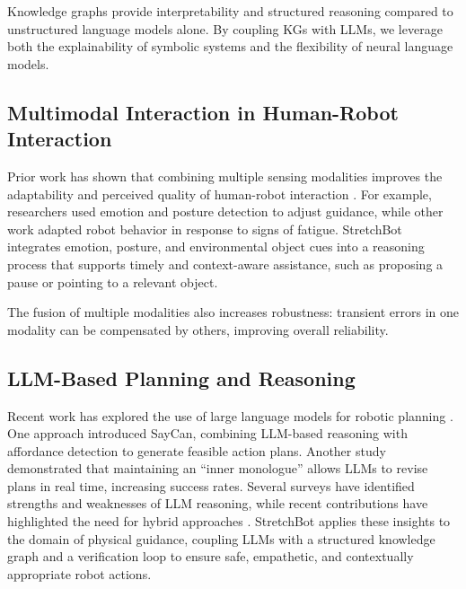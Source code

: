 Knowledge graphs provide interpretability and structured reasoning compared to unstructured language models alone. By coupling KGs with LLMs, we leverage both the explainability of symbolic systems and the flexibility of neural language models.

\subsection{Multimodal Interaction in Human-Robot Interaction}

Prior work has shown that combining multiple sensing modalities improves the adaptability and perceived quality of human-robot interaction \cite{ref10}. For example, researchers \cite{ref10} used emotion and posture detection to adjust guidance, while other work \cite{ref11} adapted robot behavior in response to signs of fatigue. StretchBot integrates emotion, posture, and environmental object cues into a reasoning process that supports timely and context-aware assistance, such as proposing a pause or pointing to a relevant object.

The fusion of multiple modalities also increases robustness: transient errors in one modality can be compensated by others, improving overall reliability.

\subsection{LLM-Based Planning and Reasoning}

Recent work has explored the use of large language models for robotic planning \cite{ref12}. One approach \cite{ref12} introduced SayCan, combining LLM-based reasoning with affordance detection to generate feasible action plans. Another study \cite{ref13} demonstrated that maintaining an ``inner monologue'' allows LLMs to revise plans in real time, increasing success rates. Several surveys \cite{ref14} have identified strengths and weaknesses of LLM reasoning, while recent contributions have highlighted the need for hybrid approaches \cite{ref15}. StretchBot applies these insights to the domain of physical guidance, coupling LLMs with a structured knowledge graph and a verification loop to ensure safe, empathetic, and contextually appropriate robot actions.
